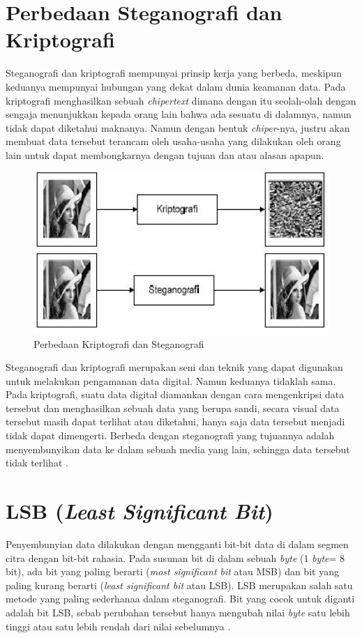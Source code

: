 \section{Perbedaan Steganografi dan Kriptografi}
Steganografi dan kriptografi mempunyai prinsip kerja yang berbeda, meskipun keduanya mempunyai hubungan yang dekat dalam dunia keamanan data. Pada kriptografi menghasilkan sebuah \emph{chipertext} dimana dengan itu seolah-olah dengan sengaja menunjukkan kepada orang lain bahwa ada sesuatu di dalamnya, namun tidak dapat diketahui maknanya. Namun dengan bentuk \emph{chiper}-nya, justru akan membuat data tersebut terancam oleh usaha-usaha yang dilakukan oleh orang lain untuk dapat membongkarnya dengan tujuan dan atau alasan apapun.
\begin{figure}[H]
	\centering
	\includegraphics[width=1\textwidth]{gambar/perbedaan_kripsteg}
	\caption{Perbedaan Kriptografi dan Steganografi}
	\label{perbedaan_kripsteg}
\end{figure}

Steganografi dan kriptografi merupakan seni dan teknik yang dapat digunakan untuk melakukan pengamanan data digital. Namun keduanya tidaklah sama. Pada kriptografi, suatu data digital diamankan dengan cara mengenkripsi data tersebut dan menghasilkan sebuah data yang berupa sandi, secara visual data tersebut masih dapat terlihat atau diketahui, hanya saja data tersebut menjadi tidak dapat dimengerti. Berbeda dengan steganografi yang tujuannya adalah menyembunyikan data ke dalam sebuah media yang lain, sehingga data tersebut tidak terlihat \cite{setiana}.

\section{LSB (\emph{Least Significant Bit})}
Penyembunyian data dilakukan dengan mengganti bit-bit data di dalam segmen citra dengan bit-bit rahasia. Pada susunan bit di dalam sebuah \emph{byte} (1 \emph{byte}= 8 bit), ada bit yang paling berarti (\emph{most significant bit} atau MSB) dan bit yang paling kurang berarti (\emph{least significant bit} atau LSB). LSB merupakan salah satu metode yang paling sederhanaa dalam steganografi. Bit yang cocok untuk diganti adalah bit LSB, sebab perubahan tersebut hanya mengubah nilai \emph{byte} satu lebih tinggi atau satu lebih rendah dari nilai sebelumnya \cite{munir}.

